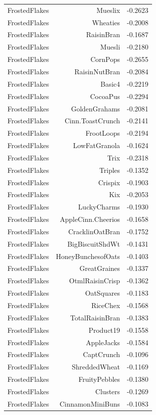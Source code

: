 \begin{longtable}{@{}lrr@{}}
FrostedFlakes & Mueslix & -0.2623 \\
FrostedFlakes & Wheaties & -0.2008 \\
FrostedFlakes & RaisinBran & -0.1687 \\
FrostedFlakes & Muesli & -0.2180 \\
FrostedFlakes & CornPops & -0.2655 \\
FrostedFlakes & RaisinNutBran & -0.2084 \\
FrostedFlakes & Basic4 & -0.2219 \\
FrostedFlakes & CocoaPus & -0.2294 \\
FrostedFlakes & GoldenGrahams & -0.2081 \\
FrostedFlakes & Cinn.ToastCrunch & -0.2141 \\
FrostedFlakes & FrootLoops & -0.2194 \\
FrostedFlakes & LowFatGranola & -0.1624 \\
FrostedFlakes & Trix & -0.2318 \\
FrostedFlakes & Triples & -0.1352 \\
FrostedFlakes & Crispix & -0.1903 \\
FrostedFlakes & Kix & -0.2053 \\
FrostedFlakes & LuckyCharms & -0.1930 \\
FrostedFlakes & AppleCinn.Cheerios & -0.1658 \\
FrostedFlakes & CracklinOatBran & -0.1752 \\
FrostedFlakes & BigBiscuitShdWt & -0.1431 \\
FrostedFlakes & HoneyBunchesofOats & -0.1403 \\
FrostedFlakes & GreatGraines & -0.1337 \\
FrostedFlakes & OtmlRaisinCrisp & -0.1362 \\
FrostedFlakes & OatSquares & -0.1183 \\
FrostedFlakes & RiceChex & -0.1568 \\
FrostedFlakes & TotalRaisinBran & -0.1383 \\
FrostedFlakes & Product19 & -0.1558 \\
FrostedFlakes & AppleJacks & -0.1584 \\
FrostedFlakes & CaptCrunch & -0.1096 \\
FrostedFlakes & ShreddedWheat & -0.1169 \\
FrostedFlakes & FruityPebbles & -0.1380 \\
FrostedFlakes & Clusters & -0.1269 \\
FrostedFlakes & CinnamonMiniBuns & -0.1083 \\

\end{longtable}
